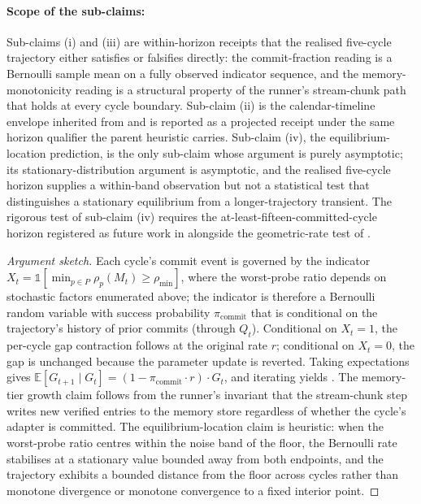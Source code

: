 \begin{heuristic}
\paragraph{Scope of the sub-claims:} Sub-claims (i) and (iii) are within-horizon receipts that the realised five-cycle trajectory either satisfies or falsifies directly: the commit-fraction reading is a Bernoulli sample mean on a fully observed indicator sequence, and the memory-monotonicity reading is a structural property of the runner's stream-chunk path that holds at every cycle boundary. Sub-claim (ii) is the calendar-timeline envelope inherited from  and is reported as a projected receipt under the same horizon qualifier the parent heuristic carries. Sub-claim (iv), the equilibrium-location prediction, is the only sub-claim whose argument is purely asymptotic; its stationary-distribution argument is asymptotic, and the realised five-cycle horizon supplies a within-band observation but not a statistical test that distinguishes a stationary equilibrium from a longer-trajectory transient. The rigorous test of sub-claim (iv) requires the at-least-fifteen-committed-cycle horizon registered as future work in  alongside the geometric-rate test of .
\end{heuristic}

\begin{proof}[Argument sketch]
Each cycle's commit event is governed by the indicator $X_t = \mathbb{1}[\min_{p \in P} \rho_p(M_t) \ge \rho_{\min}]$, where the worst-probe ratio depends on stochastic factors enumerated above; the indicator is therefore a Bernoulli random variable with success probability $\pi_{\mathrm{commit}}$ that is conditional on the trajectory's history of prior commits (through $Q_t$). Conditional on $X_t = 1$, the per-cycle gap contraction follows  at the original rate $r$; conditional on $X_t = 0$, the gap is unchanged because the parameter update is reverted. Taking expectations gives $\mathbb{E}[G_{t+1} \mid G_t] = (1 - \pi_{\mathrm{commit}} \cdot r) \cdot G_t$, and iterating yields . The memory-tier growth claim follows from the runner's invariant that the stream-chunk step writes new verified entries to the memory store regardless of whether the cycle's adapter is committed. The equilibrium-location claim is heuristic: when the worst-probe ratio centres within the noise band of the floor, the Bernoulli rate stabilises at a stationary value bounded away from both endpoints, and the trajectory exhibits a bounded distance from the floor across cycles rather than monotone divergence or monotone convergence to a fixed interior point.
\end{proof}

